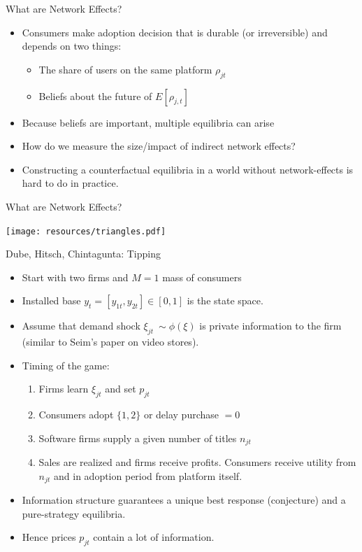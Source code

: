 \begin{frame}{What are Network Effects?}
\begin{itemize}
\item Consumers make adoption decision that is durable (or irreversible) and depends on two things:
\begin{itemize}
\item The share of users on the same platform $\rho_{jt}$
\item Beliefs about the future of $E[\rho_{j,t}]$
\end{itemize}
\item Because beliefs are important, multiple equilibria can arise
\item How do we measure the size/impact of indirect network effects?
\item Constructing a counterfactual equilibria in a world without network-effects is hard to do in practice.
\end{itemize}
\end{frame}

\begin{frame}{What are Network Effects?}
\begin{center}
\texttt{[image: resources/triangles.pdf]}
\end{center}
\end{frame}


\begin{frame}{Dube, Hitsch, Chintagunta: Tipping}

\begin{itemize}
\item Start with two firms and $M=1$ mass of consumers
\item Installed base $y_{t} = [y_{1t},y_{2t}] \in [0,1]$ is the state space.
\item Assume that demand shock $\xi_{jt}~\sim \phi(\xi)$ is private information to the firm (similar to Seim's paper on video stores).
\item Timing of the game:
\begin{enumerate}
\item Firms learn $\xi_{jt}$ and set $p_{jt}$
\item Consumers adopt $\{1,2\}$ or delay purchase $=0$
\item Software firms supply a given number of titles $n_{jt}$
\item Sales are realized and firms receive profits. Consumers receive utility from $n_{jt}$ and in adoption period from platform itself.
\end{enumerate}
\item Information structure guarantees a unique best response (conjecture) and a pure-strategy equilibria.
\item Hence prices $p_{jt}$ contain a lot of information.
\end{itemize}
\end{frame}



